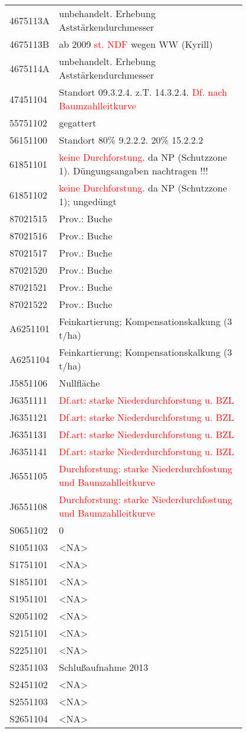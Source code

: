 \begin{singlespace}
{\begin{longtabu}{l p{0.8\linewidth}}
      4675113A & unbehandelt. Erhebung Aststärkendurchmesser \\
      4675113B & ab 2009 \textcolor{red}{st. NDF} wegen WW (Kyrill) \\
      4675114A & unbehandelt. Erhebung Aststärkendurchmesser \\
      47451104 & Standort 09.3.2.4. z.T. 14.3.2.4. \textcolor{red}{Df. nach Baumzahlleitkurve} \\
      55751102 & gegattert \\
      56151100 & Standort 80\% 9.2.2.2. 20\% 15.2.2.2 \\
      61851101 & \textcolor{red}{keine Durchforstung.} da NP (Schutzzone 1). Düngungsangaben nachtragen !!! \\
      61851102 & \textcolor{red}{keine Durchforstung.} da NP (Schutzzone 1); ungedüngt \\
      87021515 & Prov.: Buche \\
      87021516 & Prov.: Buche \\
      87021517 & Prov.: Buche \\
      87021520 & Prov.: Buche \\
      87021521 & Prov.: Buche \\
      87021522 & Prov.: Buche \\
      A6251101 & Feinkartierung; Kompensationskalkung (3 t/ha) \\
      A6251104 & Feinkartierung; Kompensationskalkung (3 t/ha) \\
      J5851106 & Nullfläche \\
      J6351111 & \textcolor{red}{Df.art: starke Niederdurchforstung u. BZL} \\
      J6351121 & \textcolor{red}{Df.art: starke Niederdurchforstung u. BZL} \\
      J6351131 & \textcolor{red}{Df.art: starke Niederdurchforstung u. BZL} \\
      J6351141 & \textcolor{red}{Df.art: starke Niederdurchforstung u. BZL} \\
      J6551105 & \textcolor{red}{Durchforstung: starke Niederdurchfostung und Baumzahlleitkurve} \\
      J6551108 & \textcolor{red}{Durchforstung: starke Niederdurchfostung und Baumzahlleitkurve} \\
      S0651102 & 0 \\
      S1051103 & <NA> \\
      S1751101 & <NA> \\
      S1851101 & <NA> \\
      S1951101 & <NA> \\
      S2051102 & <NA> \\
      S2151101 & <NA> \\
      S2251101 & <NA> \\
      S2351103 & Schlußaufnahme 2013 \\
      S2451102 & <NA> \\
      S2551103 & <NA> \\
      S2651104 & <NA> \\
    \end{longtabu}
  }
\end{singlespace}

